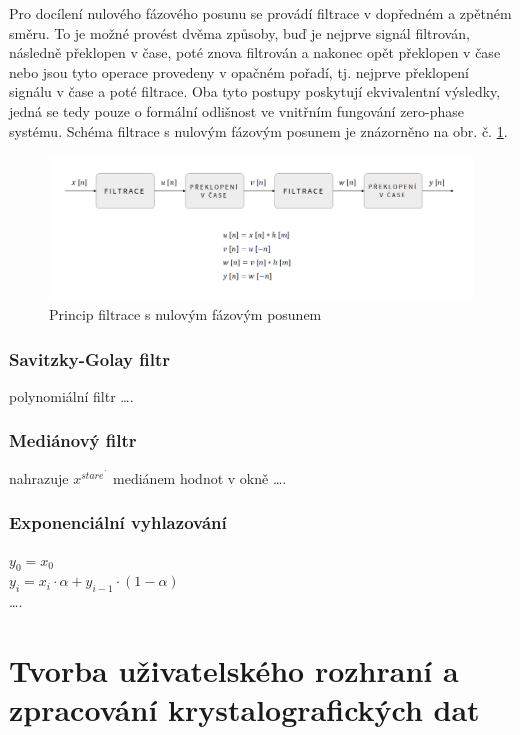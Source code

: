 \documentclass[a4paper, 12pt]{article}
\begin{document}
Pro docílení nulového fázového posunu se provádí filtrace v dopředném a zpětném směru. To je možné provést dvěma způsoby, buď je nejprve signál filtrován, následně překlopen v čase, poté znova filtrován a nakonec opět překlopen v čase nebo jsou tyto operace provedeny v opačném pořadí, tj. nejprve překlopení signálu v čase a poté filtrace. Oba tyto postupy poskytují ekvivalentní výsledky, jedná se tedy pouze o formální odlišnost ve vnitřním fungování zero-phase systému. Schéma filtrace s nulovým fázovým posunem je znázorněno na obr. č. \ref{fig:zerophase}.
\begin{figure}[hbt!]
  \centering
  \includegraphics[width=\linewidth]{zero-phase_moje.png}
  \caption{Princip filtrace s nulovým fázovým posunem}
  \label{fig:zerophase}
\end{figure}

\subsubsection{Savitzky-Golay filtr}
\label{sec:filtr2}
polynomiální filtr
\ldots .

\subsubsection{Mediánový filtr}
\label{sec:filtr3}
nahrazuje \(x^{stare^{´}}\) mediánem hodnot v okně
\ldots .

\subsubsection{Exponenciální vyhlazování}
\label{sec:filtr4}
\(y_0 = x_0\)\\
\(y_i = x_i · \alpha + y_{i-1} · (1-\alpha)\)\\
\ldots .


\newpage
\section{Tvorba uživatelského rozhraní a zpracování krystalografických dat}
\end{document}
